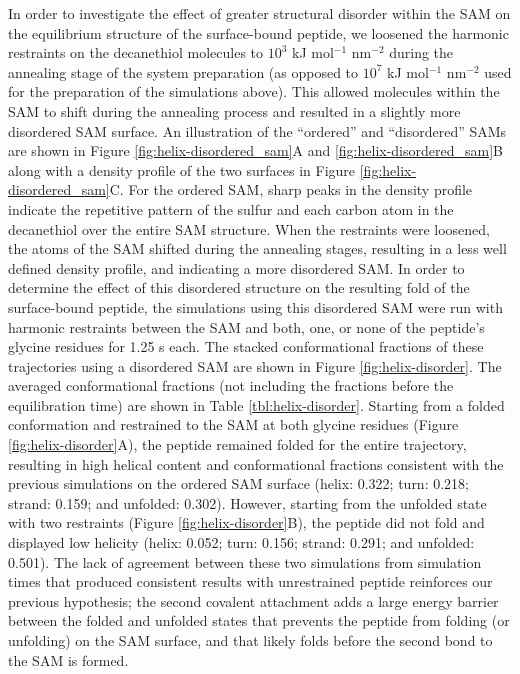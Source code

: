 In order to investigate the effect of greater structural disorder within the SAM on the equilibrium structure of the surface-bound peptide, we loosened the harmonic restraints on the decanethiol molecules to $10^3$ kJ mol$^{-1}$ nm$^{-2}$ during the annealing stage of the system preparation (as opposed to $10^7$ kJ mol$^{-1}$ nm$^{-2}$ used for the preparation of the simulations above). 
This allowed molecules within the SAM to shift during the annealing process and resulted in a slightly more disordered SAM surface. 
An illustration of the ``ordered'' and ``disordered'' SAMs are shown in Figure \ref{fig:helix-disordered_sam}A and \ref{fig:helix-disordered_sam}B along with a density profile of the two surfaces in Figure \ref{fig:helix-disordered_sam}C. 
For the ordered SAM, sharp peaks in the density profile indicate the repetitive pattern of the sulfur and each carbon atom in the decanethiol over the entire SAM structure. 
When the restraints were loosened, the atoms of the SAM shifted during the annealing stages, resulting in a less well defined density profile, and indicating a more disordered SAM. 
In order to determine the effect of this disordered structure on the resulting fold of the surface-bound peptide, the simulations using this disordered SAM were run with harmonic restraints between the SAM and both, one, or none of the peptide's glycine residues for 1.25 \textmu{}s each. 
The stacked conformational fractions of these trajectories using a disordered SAM are shown in Figure \ref{fig:helix-disorder}. 
The averaged conformational fractions (not including the fractions before the equilibration time) are shown in Table \ref{tbl:helix-disorder}. 
Starting from a folded conformation and restrained to the SAM at both glycine residues (Figure \ref{fig:helix-disorder}A), the peptide remained folded for the entire trajectory, resulting in high helical content and conformational fractions consistent with the previous simulations on the ordered SAM surface (helix: 0.322; turn: 0.218; strand: 0.159; and unfolded: 0.302). 
However, starting from the unfolded state with two restraints (Figure \ref{fig:helix-disorder}B), the peptide did not fold and displayed low helicity (helix: 0.052; turn: 0.156; strand: 0.291; and unfolded: 0.501). 
The lack of agreement between these two simulations from simulation times that produced consistent results with unrestrained peptide reinforces our previous hypothesis; the second covalent attachment adds a large energy barrier between the folded and unfolded states that prevents the peptide from folding (or unfolding) on the SAM surface, and that \pep{} likely folds before the second bond to the SAM is formed.

